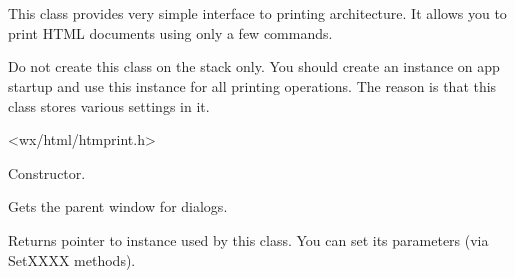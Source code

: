 %
%

\section{}\label{wxhtmleasyprinting}

This class provides very simple interface to printing 
architecture. It allows you to print HTML documents using
only a few commands. 


Do not create this class on the stack only. You should create an instance on app 
startup and use this instance for all printing operations. The reason is that
this class stores various settings in it.




<wx/html/htmprint.h>



\label{wxhtmleasyprintingwxhtmleasyprinting}


Constructor.




\label{wxhtmleasyprintinggetparentwindow}


Gets the parent window for dialogs.

\label{wxhtmleasyprintinggetprintdata}


Returns pointer to  instance used by this class. You can
set its parameters (via SetXXXX methods).

\label{wxhtmleasyprintinggetpagesetupdata}

